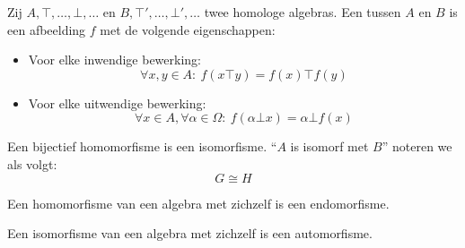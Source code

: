 \documentclass[main.tex]{subfiles}
\begin{document}
\begin{de}
  \label{de:morfisme}
  Zij $A,\top,\dotsc,\bot,\dotsc$ en $B,\top',\dotsc,\bot',\dotsc$ twee homologe algebras.
  Een  tussen $A$ en $B$ is een afbeelding $f$ met de volgende eigenschappen:
  \begin{itemize}
  \item Voor elke inwendige bewerking:
    \[ \forall x,y \in A:\ f(x\top y) = f(x) \top f(y) \]  
  \item Voor elke uitwendige bewerking:
    \[ \forall x \in A,\forall \alpha\in\Omega:\ f(\alpha\bot x) = \alpha\bot f(x) \]  
  \end{itemize}
\end{de}

\begin{de}
  Een bijectief homomorfisme is een isomorfisme.
  ``$A$ is isomorf met $B$'' noteren we als volgt:
  \[ G \cong H \]
\end{de}

\begin{de}
  Een homomorfisme van een algebra met zichzelf is een endomorfisme.
\end{de}

\begin{de}
  Een isomorfisme van een algebra met zichzelf is een automorfisme.
\end{de}
\end{document}
